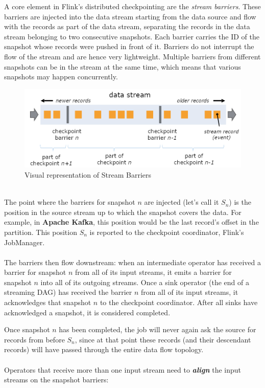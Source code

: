 A core element in Flink’s distributed checkpointing are the \textit{stream barriers}. These barriers are injected into the data stream starting from the data source and flow with the records as part of the data stream, separating the records in the data stream belonging to two consecutive snapshots. Each barrier carries the ID of the snapshot whose records were pushed in front of it. Barriers do not interrupt the flow of the stream and are hence very lightweight. Multiple barriers from different snapshots can be in the stream at the same time, which means that various snapshots may happen concurrently.
\\
\begin{figure}[h]
    \centering
    \includegraphics[width=0.7\linewidth]{Figures/stream_barriers}
    \caption{Visual representation of Stream Barriers}
    \label{fig:streambarriers}
\end{figure}
\\
The point where the barriers for snapshot $n$ are injected (let’s call it $S_n$) is the position in the source stream up to which the snapshot covers the data. For example, in \textbf{Apache Kafka}, this position would be the last record’s offset in the partition. This position $S_n$ is reported to the checkpoint coordinator, Flink’s JobManager.
\\
\\
The barriers then flow downstream: when an intermediate operator has received a barrier for snapshot $n$ from all of its input streams, it emits a barrier for snapshot $n$ into all of its outgoing streams. Once a sink operator (the end of a streaming DAG) has received the barrier $n$ from all of its input streams, it acknowledges that snapshot $n$ to the checkpoint coordinator. After all sinks have acknowledged a snapshot, it is considered completed.

Once snapshot $n$ has been completed, the job will never again ask the source for records from before $S_n$, since at that point these records (and their descendant records) will have passed through the entire data flow topology.
\\
\\
Operators that receive more than one input stream need to \textit{\textbf{align}} the input streams on the snapshot barriers:


